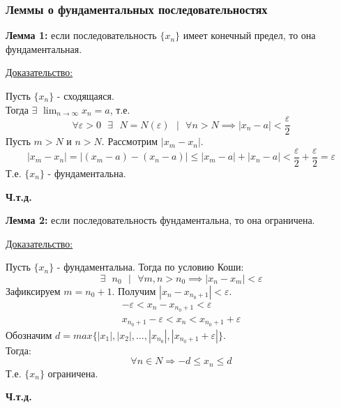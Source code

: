 \documentclass[12pt]{article}
\def\posl#1#2{\{#1_{#2}\}}
\begin{document}
    \subsubsection*{Леммы о фундаментальных последовательностях}
    \noindent \textbf{Лемма 1:} если последовательность $\{x_n\}$ имеет конечный предел, то она фундаментальная.\par\noindent
    \underline{Доказательство:}
    \begin{adjustwidth}{1.5em}{1.5em}
        Пусть $\posl{x}{n}$ - сходящаяся.\\
        Тогда $\exists$ $\lim_{n\to\infty}x_n = a$, т.е.
        \[ \forall \varepsilon > 0 \text{ } \exists \text{ } N = N(\varepsilon) \text{ } \big| \text{ } \forall n > N \implies |x_{n} - a| < \frac{\varepsilon}{2} \]
        Пусть $m > N$ и $n > N$. Рассмотрим $|x_m - x_n|$.
        \[
            |x_m - x_n| = |(x_m - a) - (x_n - a)| \le |x_m - a| + |x_n - a| < \frac{\varepsilon}{2} + \frac{\varepsilon}{2} = \varepsilon
        \]
        Т.е. $\posl{x}{n}$ - фундаментальна.
        \begin{center}
            \textbf{Ч.т.д.}
        \end{center}
    \end{adjustwidth}

    \noindent \textbf{Лемма 2:} если последовательность фундаментальна, то она ограничена.\par\noindent
    \underline{Доказательство:}\par
    \begin{adjustwidth}{1.5em}{1.5em}
        Пусть $\posl{x}{n}$ - фундаментальна. Тогда по условию Коши:
        \[ \exists \text{ } n_0 \text{ } \big| \text{ } \forall m,n > n_0 \implies |x_n - x_m| < \varepsilon \]
        Зафиксируем $m = n_0 + 1$. Получим $|x_n - x_{n_0+1}| < \varepsilon$.
        \begin{gather*}
            -\varepsilon < x_n - x_{n_0 + 1} < \varepsilon\\
            x_{n_0 + 1} - \varepsilon < x_n <  x_{n_0 + 1} + \varepsilon
        \end{gather*}
        Обозначим $d = max\{|x_1|, |x_2|, \dots, |x_{n_0}|, |x_{n_0+1} + \varepsilon|\}$.\\
        Тогда:
        \[ \forall n \in N \Rightarrow -d \le x_n \le d \]
        Т.е. $\posl{x}{n}$ ограничена.
        \begin{center}
            \textbf{Ч.т.д.}
        \end{center}
    \end{adjustwidth}
\end{document}
